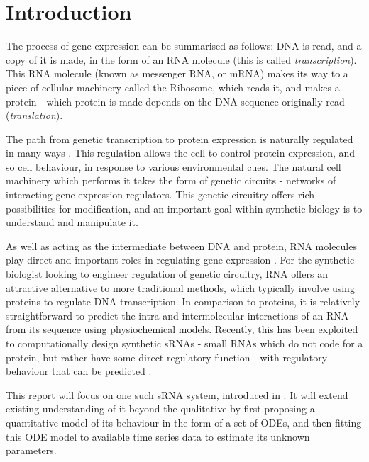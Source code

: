\documentclass[10pt,journal]{./IEEE_latex_class/IEEEtran}
\begin{document}
\IEEEpeerreviewmaketitle




\section{Introduction}
\label{sec: Intro}
The process of gene expression can be summarised as follows: DNA is read, and a copy of it is made, in the form of an RNA molecule (this is called \textit{transcription}). This RNA molecule (known as messenger RNA, or mRNA) makes its way to a piece of cellular machinery called the Ribosome, which reads it, and makes a protein - which protein is made depends on the DNA sequence originally read (\textit{translation}).  

 The path from genetic transcription to protein expression is naturally regulated in many ways \cite{MolecularBiology}. This regulation allows the cell to control protein expression, and so cell behaviour, in response to various environmental cues. The natural cell machinery which performs it takes the form of genetic circuits - networks of interacting gene expression regulators. This genetic circuitry offers rich possibilities for modification, and an important goal within synthetic biology is to understand and manipulate it.

As well as acting as the intermediate between DNA and protein, RNA molecules play direct and important roles in regulating gene expression \cite{Isaacs2006}. For the synthetic biologist looking to engineer regulation of genetic circuitry, RNA offers an attractive alternative to more traditional methods, which typically involve using proteins to regulate DNA transcription. In comparison to proteins, it is relatively straightforward to predict the intra and intermolecular interactions of an RNA from its sequence using physiochemical models. Recently, this has been exploited to computationally design synthetic sRNAs - small RNAs which do not code for a protein, but rather have some direct regulatory function -  with regulatory behaviour that can be predicted \cite{Rodrigo2013}\cite{Rodrigo2012}.

This report will focus on one such sRNA system, introduced in \cite{Rodrigo2012}. It will extend existing understanding of it beyond the qualitative by first proposing a quantitative model of its behaviour in the form of a set of ODEs, and then fitting this ODE model to available time series data to estimate its unknown parameters.
\end{document}
